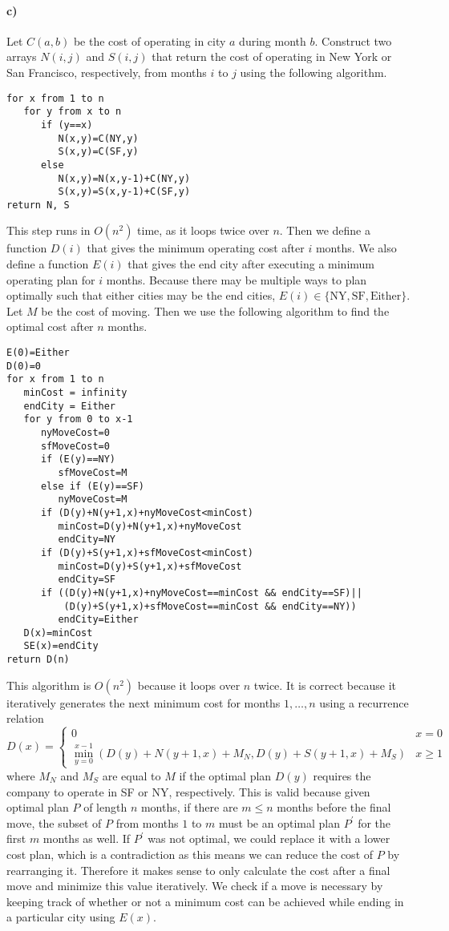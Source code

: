 \documentclass[12pt]{article}
\begin{document}
\paragraph{c)}

Let \(C(a,b)\) be the cost of operating in city \(a\) during month \(b\). Construct two arrays \(N(i,j)\) and \(S(i,j)\)
that return the cost of operating in New York or San Francisco, respectively, from months \(i\) to \(j\) using the following algorithm.
\begin{verbatim}
for x from 1 to n
   for y from x to n
      if (y==x)
         N(x,y)=C(NY,y)
         S(x,y)=C(SF,y)
      else
         N(x,y)=N(x,y-1)+C(NY,y)
         S(x,y)=S(x,y-1)+C(SF,y)
return N, S
\end{verbatim}
This step runs in \(O(n^2)\) time, as it loops twice over \(n\). Then we define a function \(D(i)\) that gives the minimum operating cost
after \(i\) months. We also define a function \(E(i)\) that gives the end city after executing a minimum operating plan for \(i\) months.
Because there may be multiple ways to plan optimally such that either cities may be the end cities,
\(E(i)\in\{\text{NY},\text{SF},\text{Either}\}\). Let \(M\) be the cost of moving. Then we use the following algorithm to find the
optimal cost after \(n\) months.
\begin{verbatim}
E(0)=Either
D(0)=0
for x from 1 to n
   minCost = infinity
   endCity = Either
   for y from 0 to x-1
      nyMoveCost=0
      sfMoveCost=0
      if (E(y)==NY)
         sfMoveCost=M
      else if (E(y)==SF)
         nyMoveCost=M
      if (D(y)+N(y+1,x)+nyMoveCost<minCost)
         minCost=D(y)+N(y+1,x)+nyMoveCost
         endCity=NY
      if (D(y)+S(y+1,x)+sfMoveCost<minCost)
         minCost=D(y)+S(y+1,x)+sfMoveCost
         endCity=SF
      if ((D(y)+N(y+1,x)+nyMoveCost==minCost && endCity==SF)||
          (D(y)+S(y+1,x)+sfMoveCost==minCost && endCity==NY))
         endCity=Either
   D(x)=minCost
   SE(x)=endCity
return D(n)
\end{verbatim}
This algorithm is \(O(n^2)\) because it loops over \(n\) twice. It is correct because it iteratively generates the next minimum cost for months \(1,\ldots,n\)
using a recurrence relation
\[D(x)=\begin{cases} 0 & x=0\\ \min\limits_{y=0}^{x-1} (D(y)+N(y+1,x)+M_N,D(y)+S(y+1,x)+M_S) & x\geq1 \end{cases}\]
where \(M_N\) and \(M_S\) are equal to \(M\) if the optimal plan \(D(y)\) requires the company to operate in SF or NY, respectively. This is valid because given
optimal plan \(P\) of length \(n\) months, if there are \(m\leq n\) months before the final move, the subset of \(P\) from months \(1\) to \(m\) must be an
optimal plan \(P^\prime\) for the first \(m\) months as well. If \(P^\prime\) was not optimal, we could replace it with a lower cost plan, which is a contradiction
as this means we can reduce the cost of \(P\) by rearranging it. Therefore it makes sense to only calculate the cost after a final move and minimize this value iteratively.
We check if a move is necessary by keeping track of whether or not a minimum cost can be achieved while ending in a particular city using \(E(x)\).
\end{document}
